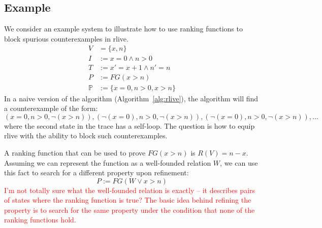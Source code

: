 \documentclass[runningheads]{llncs}
\newcommand{\red}[1]{\textcolor{red}{#1}}
\newcommand{\rlive}{\textsf{rlive}\xspace}
\newcommand{\preds}{\ensuremath{\mathbb{P}}}
\begin{document}
\subsection{Example}


We consider an example system to illustrate how to use ranking functions to block spurious counterexamples in \rlive.
\begin{align*}
    V & = \{x,n\} \\
    I & := x = 0 \land n > 0 \\
    T & := x' = x + 1 \land n' = n \\
    P & := FG(x>n) \\
    \preds & := \{ x=0, n>0, x>n \}
\end{align*}
In a naive version of the algorithm (Algorithm~\ref{alg:rlive}), the algorithm will find a counterexample of the form:
\[
    (x=0,n>0,\neg(x>n)), (\neg(x=0),n>0,\neg(x>n)), (\neg(x=0),n>0,\neg(x>n)), \dots
\]
where the second state in the trace has a self-loop. The question is how to equip \rlive with the
ability to block such counterexamples.

A ranking function that can be used to prove $FG(x>n)$ is $R(V) = n-x$. Assuming we can represent the function as a well-founded relation $W$, we can use this fact to search for a different property upon refinement: 
\[
    P := FG(W \lor x>n)
\]
\red{I'm not totally sure what the well-founded relation is exactly -- it describes pairs of states where the ranking function is true? The basic idea behind refining the property is to search for the same property under the condition that none of the ranking functions hold.}




\end{document}
